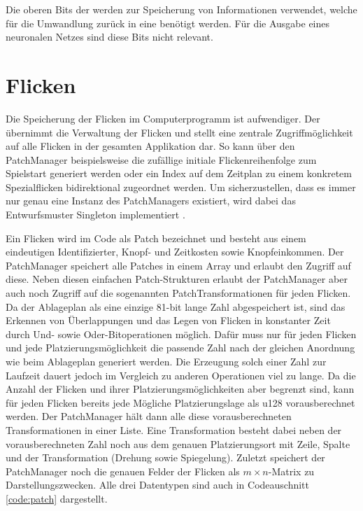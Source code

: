Die oberen Bits der \hyperref[text:natural-action-id]{} werden zur Speicherung von Informationen verwendet, welche für die Umwandlung zurück in eine \hyperref[text:action-id]{} benötigt werden. Für die Ausgabe eines neuronalen Netzes sind diese Bits nicht relevant.

\section{Flicken}

Die Speicherung der Flicken im Computerprogramm ist aufwendiger. Der  übernimmt die Verwaltung der Flicken und stellt eine zentrale Zugriffmöglichkeit auf alle Flicken in der gesamten Applikation dar. So kann über den PatchManager beispielsweise die zufällige initiale Flickenreihenfolge zum Spielstart generiert werden oder ein Index auf dem Zeitplan zu einem konkretem Spezialflicken bidirektional zugeordnet werden. Um sicherzustellen, dass es immer nur genau eine Instanz des PatchManagers existiert, wird dabei das Entwurfsmuster Singleton implementiert \cite[S. 127]{2000.Gamma}.


\vspace*{-1cm}

Ein Flicken wird im Code als Patch bezeichnet und besteht aus einem eindeutigen Identifizierter, Knopf- und Zeitkosten sowie Knopfeinkommen. Der PatchManager speichert alle Patches in einem Array und erlaubt den Zugriff auf diese. Neben diesen einfachen Patch-Strukturen erlaubt der PatchManager aber auch noch Zugriff auf die sogenannten PatchTransformationen für jeden Flicken. Da der Ablageplan als eine einzige 81-bit lange Zahl abgespeichert ist, sind das Erkennen von Überlappungen und das Legen von Flicken in konstanter Zeit durch Und- sowie Oder-Bitoperationen möglich. Dafür muss nur für jeden Flicken und jede Platzierungsmöglichkeit die passende Zahl nach der gleichen Anordnung wie beim Ablageplan generiert werden. Die Erzeugung solch einer Zahl zur Laufzeit dauert jedoch im Vergleich zu anderen Operationen viel zu lange. Da die Anzahl der Flicken und ihrer Platzierungsmöglichkeiten aber begrenzt sind, kann für jeden Flicken bereits jede Mögliche Platzierungslage als \ac{u128} vorausberechnet werden. Der PatchManager hält dann alle diese vorausberechneten Transformationen in einer Liste. Eine Transformation besteht dabei neben der vorausberechneten Zahl noch aus dem genauen Platzierungsort mit Zeile, Spalte und der Transformation (Drehung sowie Spiegelung). Zuletzt speichert der PatchManager noch die genauen Felder der Flicken als $m\times n$-Matrix zu Darstellungszwecken. Alle drei Datentypen sind auch in Codeauschnitt \ref{code:patch} dargestellt.

